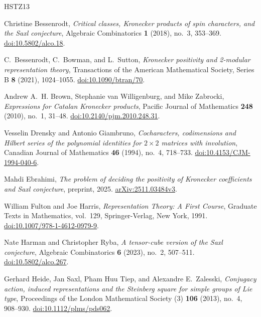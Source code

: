 \begin{thebibliography}{HSTZ13}

Christine Bessenrodt,
\emph{Critical classes, Kronecker products of spin characters, and the
Saxl conjecture},
Algebraic Combinatorics \textbf{1} (2018), no.~3, 353--369.
\href{https://doi.org/10.5802/alco.18}{doi:10.5802/alco.18}.

C.~Bessenrodt, C.~Bowman, and L.~Sutton,
\emph{Kronecker positivity and 2-modular representation theory},
Transactions of the American Mathematical Society, Series B
\textbf{8} (2021), 1024--1055.
\href{https://doi.org/10.1090/btran/70}{doi:10.1090/btran/70}.

Andrew A.~H. Brown, Stephanie van Willigenburg, and Mike Zabrocki,
\emph{Expressions for Catalan Kronecker products},
Pacific Journal of Mathematics \textbf{248} (2010), no.~1, 31--48.
\href{https://doi.org/10.2140/pjm.2010.248.31}{doi:10.2140/pjm.2010.248.31}.

Vesselin Drensky and Antonio Giambruno,
\emph{Cocharacters, codimensions and Hilbert series of the polynomial
identities for $2\times2$ matrices with involution},
Canadian Journal of Mathematics \textbf{46} (1994), no.~4, 718--733.
\href{https://doi.org/10.4153/CJM-1994-040-6}{doi:10.4153/CJM-1994-040-6}.

Mahdi Ebrahimi,
\emph{The problem of deciding the positivity of Kronecker coefficients
and Saxl conjecture}, preprint, 2025.
\href{https://arxiv.org/abs/2511.03484v3}{arXiv:2511.03484v3}.

William Fulton and Joe Harris,
\emph{Representation Theory: A First Course},
Graduate Texts in Mathematics, vol.~129,
Springer-Verlag, New York, 1991.
\href{https://doi.org/10.1007/978-1-4612-0979-9}{doi:10.1007/978-1-4612-0979-9}.

Nate Harman and Christopher Ryba,
\emph{A tensor-cube version of the Saxl conjecture},
Algebraic Combinatorics \textbf{6} (2023), no.~2, 507--511.
\href{https://doi.org/10.5802/alco.267}{doi:10.5802/alco.267}.

Gerhard Heide, Jan Saxl, Pham Huu Tiep, and Alexandre E.~Zalesski,
\emph{Conjugacy action, induced representations and the Steinberg square
for simple groups of Lie type},
Proceedings of the London Mathematical Society (3)
\textbf{106} (2013), no.~4, 908--930.
\href{https://doi.org/10.1112/plms/pds062}{doi:10.1112/plms/pds062}.


\end{thebibliography}
